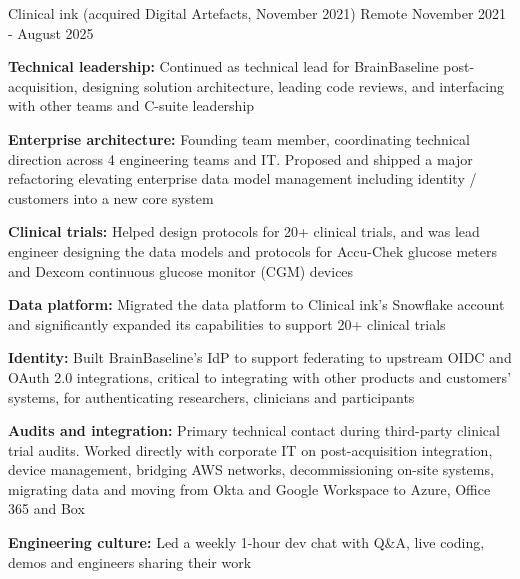 \documentclass{resume}
\begin{document}
            {Clinical ink (acquired Digital Artefacts, November 2021)}
            {Remote}
            {November 2021 - August 2025}
\begin{resumeItems}
\item \textbf{Technical leadership:} Continued as technical lead for BrainBaseline post-acquisition, designing solution architecture, leading code reviews, and interfacing with other teams and C-suite leadership
\item \textbf{Enterprise architecture:} Founding team member, coordinating technical direction across 4 engineering teams and IT.
Proposed and shipped a major refactoring elevating enterprise data model management including identity / customers into a new core system
\item \textbf{Clinical trials:} Helped design protocols for 20+ clinical trials, and was lead engineer designing the data models and protocols for Accu-Chek glucose meters and Dexcom continuous glucose monitor (CGM) devices
\item \textbf{Data platform:} Migrated the data platform to Clinical ink's Snowflake account and significantly expanded its capabilities to support 20+ clinical trials
\item \textbf{Identity:} Built BrainBaseline's IdP to support federating to upstream OIDC and OAuth 2.0 integrations, critical to integrating with other products and customers' systems, for authenticating researchers, clinicians and participants
\item \textbf{Audits and integration:} Primary technical contact during third-party clinical trial audits.
Worked directly with corporate IT on post-acquisition integration, device management, bridging AWS networks, decommissioning on-site systems, migrating data and moving from Okta and Google Workspace to Azure, Office 365 and Box
\item \textbf{Engineering culture:} Led a weekly 1-hour dev chat with Q\&A, live coding, demos and engineers sharing their work
\end{resumeItems}
\end{document}
